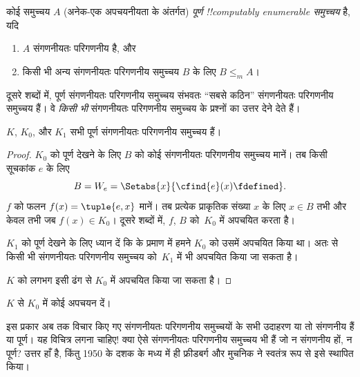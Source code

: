 \documentclass[../../../include/open-logic-section]{subfiles}
\begin{document}

\begin{defn}
कोई समुच्चय $A$ (अनेक-एक अपचयनीयता के अंतर्गत) \emph{पूर्ण
!!{computably enumerable} समुच्चय} है, यदि
\begin{enumerate}
\item $A$ संगणनीयतः परिगणनीय है, और
\item किसी भी अन्य संगणनीयतः परिगणनीय समुच्चय $B$ के लिए $B \leq_m A$।
\end{enumerate}
\end{defn}

दूसरे शब्दों में, पूर्ण संगणनीयतः परिगणनीय समुच्चय संभवतः ``सबसे कठिन''
संगणनीयतः परिगणनीय समुच्चय हैं। वे \emph{किसी भी} संगणनीयतः परिगणनीय
समुच्चय के प्रश्नों का उत्तर देने देते हैं।

\begin{thm}
$K$, $K_0$, और $K_1$ सभी पूर्ण संगणनीयतः परिगणनीय समुच्चय हैं।
\end{thm}

\begin{proof}
$K_0$ को पूर्ण देखने के लिए $B$ को कोई संगणनीयतः परिगणनीय समुच्चय
मानें। तब किसी सूचकांक $e$ के लिए
\[
B = W_e = \Setabs{x}{\cfind{e}(x) \fdefined}.
\]
$f$ को फलन $f(x) = \tuple{e, x}$ मानें। तब प्रत्येक प्राकृतिक संख्या
$x$ के लिए $x \in B$ तभी और केवल तभी जब $f(x) \in K_0$। दूसरे शब्दों
में, $f$, $B$ को~$K_0$ में अपचयित करता है।

$K_1$ को पूर्ण देखने के लिए ध्यान दें कि  के प्रमाण
में हमने $K_0$ को उसमें अपचयित किया था। अतः 
से किसी भी संगणनीयतः परिगणनीय समुच्चय को~$K_1$ में भी अपचयित किया जा
सकता है।

$K$ को लगभग इसी ढंग से $K_0$ में अपचयित किया जा सकता है।
\end{proof}

\begin{prob}
$K$ से $K_0$ में कोई अपचयन दें।
\end{prob}

\begin{digress}
इस प्रकार अब तक विचार किए गए संगणनीयतः परिगणनीय समुच्चयों के सभी उदाहरण
या तो संगणनीय हैं या पूर्ण। यह विचित्र लगना चाहिए!{} क्या ऐसे संगणनीयतः
परिगणनीय समुच्चय भी हैं जो न संगणनीय हों, न पूर्ण? उत्तर हाँ है, किंतु
1950 के दशक के मध्य में ही फ्रीडबर्ग और मुचनिक ने स्वतंत्र रूप से इसे
स्थापित किया।
\end{digress}
\end{document}

